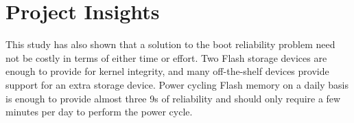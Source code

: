 \section{Project Insights}\label{sec:insights}

This study has also shown that a solution to the boot reliability problem need not be costly in terms of either time or effort.  Two Flash storage devices are enough to provide for kernel integrity, and many off-the-shelf devices provide support for an extra storage device.  Power cycling Flash memory on a daily basis is enough to provide almost three 9s of reliability and should only require a few minutes per day to perform the power cycle.
